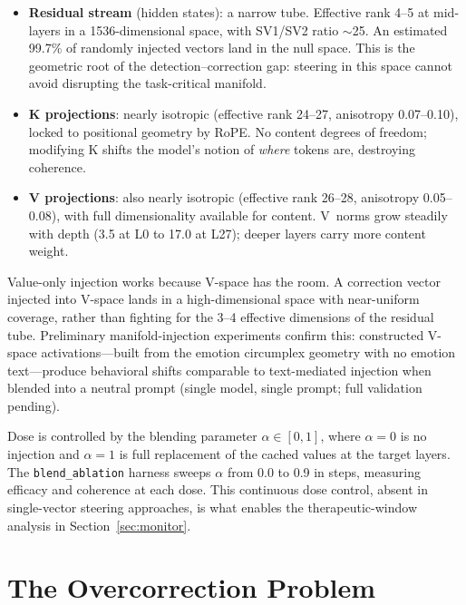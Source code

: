 \documentclass[11pt,a4paper]{article}
\begin{document}
\begin{itemize}[nosep]
  \item \textbf{Residual stream} (hidden states): a narrow tube. Effective rank
    4--5 at mid-layers in a 1536-dimensional space, with SV1/SV2 ratio $\sim$25.
    An estimated 99.7\% of randomly injected vectors land in the null space.
    This is the geometric root of the detection--correction gap: steering in
    this space cannot avoid disrupting the task-critical manifold.
  \item \textbf{K projections}: nearly isotropic (effective rank 24--27,
    anisotropy 0.07--0.10), locked to positional geometry by RoPE. No content
    degrees of freedom; modifying K shifts the model's notion of \emph{where}
    tokens are, destroying coherence.
  \item \textbf{V projections}: also nearly isotropic (effective rank 26--28,
    anisotropy 0.05--0.08), with full dimensionality available for content.
    V~norms grow steadily with depth (3.5 at L0 to 17.0 at L27); deeper layers
    carry more content weight.
\end{itemize}

Value-only injection works because V-space has the room. A correction vector
injected into V-space lands in a high-dimensional space with near-uniform
coverage, rather than fighting for the 3--4 effective dimensions of the residual
tube. Preliminary manifold-injection experiments confirm this: constructed
V-space activations---built from the emotion circumplex geometry with no emotion
text---produce behavioral shifts comparable to text-mediated injection when
blended into a neutral prompt (single model, single prompt; full validation
pending).

Dose is controlled by the blending parameter $\alpha \in [0, 1]$, where
$\alpha{=}0$ is no injection and $\alpha{=}1$ is full replacement of the
cached values at the target layers. The \texttt{blend\_ablation} harness sweeps
$\alpha$ from 0.0 to 0.9 in steps, measuring efficacy and coherence at each
dose. This continuous dose control, absent in single-vector steering approaches,
is what enables the therapeutic-window analysis in
Section~\ref{sec:monitor}.

\section{The Overcorrection Problem}
\label{sec:overcorrection}
\end{document}
